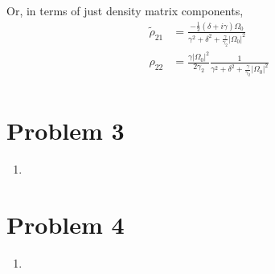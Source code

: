 \documentclass[12pt]{article}
\newcommand{\magsq}[1]{\big|#1\big|^2}
\begin{document}
Or, in terms of just density matrix components,
\begin{align*}
    \tilde{\rho}_{21} &= \frac{-\frac{1}{2}(\delta+i\gamma)\Omega_0}{\gamma^2 + \delta^2 + \frac{\gamma}{\gamma_2}\magsq{\Omega_0}} \\
    \rho_{22} &= \frac{\gamma\magsq{\Omega_0}}{2\gamma_2}\frac{1}{\gamma^2 + \delta^2 + \frac{\gamma}{\gamma_2}\magsq{\Omega_0}} \\
\end{align*}

\section*{Problem 3}
\begin{enumerate}[label=(\alph*)]
    \item 
\end{enumerate}

\section*{Problem 4}
\begin{enumerate}[label=(\alph*)]
    \item 
\end{enumerate}


\end{document}
